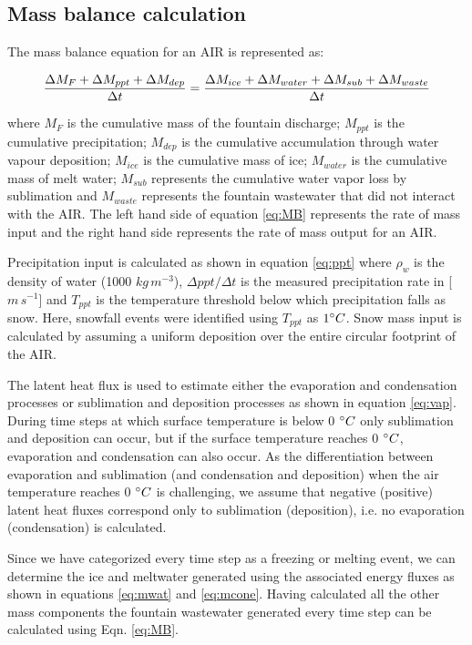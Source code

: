 \documentclass[utf8]{frontiersSCNS}
\begin{document}
\subsection{Mass balance calculation}

The mass balance equation for an AIR is represented as:

\begin{equation}
	\frac{\Delta M_{F} + \Delta M_{ppt} + \Delta M_{dep}}{\Delta t} = \frac{\Delta M_{ice} +\Delta M_{water} +
		\Delta M_{sub} + \Delta M_{waste}}{\Delta t}  \\
	\label{eq:MB}
\end{equation}

where $M_{F}$ is the cumulative mass of the fountain discharge; $M_{ppt}$ is the cumulative precipitation;  $M_{dep}$ is the cumulative
accumulation through water vapour deposition; $M_{ice}$ is the cumulative mass of ice; $M_{water}$ is the cumulative
mass of melt water; $M_{sub}$ represents the cumulative water vapor loss by sublimation and $M_{waste}$ represents the
fountain wastewater that did not interact with the AIR. The left hand side of equation \ref{eq:MB} represents the rate of
mass input and the right hand side represents the rate of mass output for an AIR.

Precipitation input is calculated as shown in equation \ref{eq:ppt} where $\rho_{w}$ is the density of water (1000
$kg\,m^{-3}$), $\Delta ppt/ \Delta t$ is the measured precipitation rate in [$m\,s^{-1}$] and $T_{ppt}$ is the temperature threshold
below which precipitation falls as snow. Here, snowfall events were identified using $T_{ppt}$ as $1 \degree C$. Snow
mass input is calculated by assuming a uniform deposition over the entire circular footprint of the AIR.

The latent heat flux is used to estimate either the evaporation and condensation processes or sublimation and deposition
processes as shown in equation \ref{eq:vap}. During time steps at which surface temperature is below 0 $\degree C$ only
sublimation and deposition can occur, but if the surface temperature reaches 0 $\degree C$, evaporation and condensation
can also occur. As the differentiation between evaporation and sublimation (and condensation and deposition) when the
air temperature reaches 0 $\degree C$ is challenging, we assume that negative (positive) latent heat fluxes correspond
only to sublimation (deposition), i.e. no evaporation (condensation) is calculated.

Since we have categorized every time step as a freezing or melting event, we can determine the ice and meltwater
generated using the associated energy fluxes as shown in equations \ref{eq:mwat} and \ref{eq:mcone}. Having calculated
all the other mass components the fountain wastewater generated every time step can be calculated using Eqn.
\ref{eq:MB}.
\end{document}
